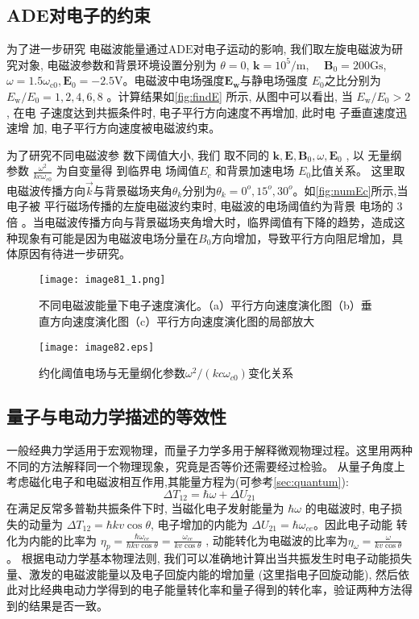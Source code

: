 \subsection{ADE对电子的约束}
为了进一步研究 电磁波能量通过$ \mathrm{ADE}  $对电子运动的影响, 我们取左旋电磁波为研究对象, 电磁波参数和背景环境设置分别为  $
\theta=0$, $ \mathbf{k}=10^{5} / \mathrm{m}$, $\quad \mathbf{B}_{0}=200 
\mathrm{Gs}$,$ \omega=1.5 \omega_{\mathrm{c} 0}, \mathbf{E}_{0}=-2.5 
\mathrm{V}  $。电磁波中电场强度$ \mathbf{E}_{\mathbf{w}}  $与静电场强度  
$E_{0}$之比分别为$E_{\mathrm{w}} / E_{0}=1,2,4,6,8 $ 。计算结果如\autoref{fig:findE} 所示, 从图中可以看出, 当 $ E_{\mathrm{w}} / E_{0}>2$ , 在电
子速度达到共振条件时, 电子平行方向速度不再增加, 此时电 子垂直速度迅速增
加, 电子平行方向速度被电磁波约束。
\par 为了研究不同电磁波参 数下阈值大小, 我们
取不同的  $\mathbf{k}, \mathbf{E}, \mathbf{B}_{0}, \omega, \mathbf{E}_{0}$ , 以
无量纲参数  $\frac{\omega^{2}}{k c  \omega_{c 0}} $ 为自变量得 到临界电
场阈值$  E_{c} $ 和背景加速电场  $E_{0}  $比值关系。 这里取电磁波传播方向$\vec k$与背景磁场夹角$\theta_k$分别为$\theta_k=0^o,15^o,30^o$。如\autoref{fig:numEc}所示,当电子被 平行磁场传播的左旋电磁波约束时, 电磁波的电场阈值约为背景
电场的 3 倍 。当电磁波传播方向与背景磁场夹角增大时，临界阈值有下降的趋势，造成这种现象有可能是因为电磁波电场分量在$B_0$方向增加，导致平行方向阻尼增加，具体原因有待进一步研究。
\begin{figure}
\centering
\texttt{[image: image81\_1.png]}
\caption{\label{fig:findE}不同电磁波能量下电子速度演化。（a）平行方向速度演化图（b）垂直方向速度演化图（c）平行方向速度演化图的局部放大}
\end{figure}

\begin{figure}
\centering
\texttt{[image: image82.eps]}
\caption{\label{fig:numEc}约化阈值电场与无量纲化参数$ω^2/(kcω_{c0} )$变化关系}
\end{figure}
\subsection{量子与电动力学描述的等效性}
一般经典力学适用于宏观物理，而量子力学多用于解释微观物理过程。这里用两种不同的方法解释同一个物理现象，究竟是否等价还需要经过检验。
从量子角度上考虑磁化电子和电磁波相互作用,其能量方程为(可参考\autoref{sec:quantum}):
\begin{equation}
\Delta T_{12}=\hbar\omega+\Delta U_{21}
\end{equation}
在满足反常多普勒共振条件下时, 当磁化电子发射能量为  $\hbar \omega $ 的电磁波时, 电子损失的动量为  $\Delta T_{12}=\hbar k v \cos \theta $, 电子增加的内能为  $\Delta U_{21}=\hbar \omega_{c e}$。因此电子动能 转化为内能的比率为 $ \eta_{p}=\frac{\hbar \omega_{c e}}{\hbar k v \cos \theta}=\frac{\omega_{c e}}{k v \cos \theta}$ , 动能转化为电磁波的比率为$  \eta_{\omega}=\frac{\omega}{k v\cos \theta} $。 根据电动力学基本物理法则, 我们可以准确地计算出当共振发生时电子动能损失 量、激发的电磁波能量以及电子回旋内能的增加量 (这里指电子回旋动能), 然后依此对比经典电动力学得到的电子能量转化率和量子得到的转化率，验证两种方法得到的结果是否一致。

